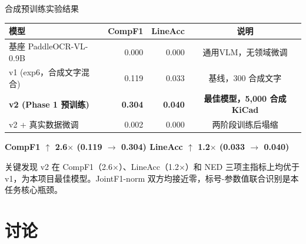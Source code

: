 \documentclass[10pt,aspectratio=169,table]{beamer}
\begin{document}
\begin{frame}{合成预训练实验结果}
  \begin{table}
    \centering
    \scriptsize
    \begin{tabular}{lrrc}
      \toprule
      \textbf{模型} & \textbf{CompF1} & \textbf{LineAcc} & \textbf{说明} \\
      \midrule
      基座 PaddleOCR-VL-0.9B & 0.000 & 0.000 & 通用VLM，无领域微调 \\
      v1 (exp6，合成文字混合) & 0.119 & 0.033 & 基线，300 合成文字 \\
      \rowcolor{blue!10} \textbf{v2 (Phase 1 预训练)} & \textbf{0.304} & \textbf{0.040} & \textbf{最佳模型，5,000 合成 KiCad} \\
      v2 + 真实数据微调 & 0.002 & 0.000 & 两阶段训练后塌缩 \\
      \bottomrule
    \end{tabular}
  \end{table}
  \vspace{-0.3cm}
  \begin{center}
    \small \textbf{CompF1 $\uparrow$ 2.6$\times$ (0.119 $\to$ 0.304) \quad LineAcc $\uparrow$ 1.2$\times$ (0.033 $\to$ 0.040)}
  \end{center}
  \begin{block}{关键发现}
    \footnotesize
    v2 在 CompF1（2.6$\times$）、LineAcc（1.2$\times$）和 NED 三项主指标上均优于 v1，为本项目最佳模型。JointF1-norm 双方均接近零，标号-参数值联合识别是本任务核心瓶颈。
  \end{block}
\end{frame}

\section{讨论}
\end{document}
